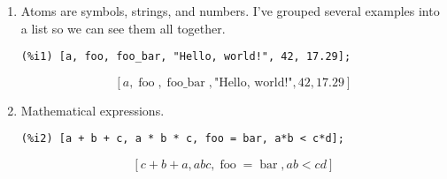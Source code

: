 \documentclass[12pt,leqno]{article}
\begin{document}
\begin{enumerate}

\item Atoms are symbols, strings, and numbers.
I've grouped several examples into a list so we can see them all together.
\begin{verbatim}
(%i1) [a, foo, foo_bar, "Hello, world!", 42, 17.29];
\end{verbatim}
\begin{dmath}[number={\(\mathop{\mathrm{\%o}_{1}}\)}]
\left[a, \mathop{\mathrm{foo}}, \mathop{\mathrm{foo\_bar}}, \text{"Hello, world!"}, 42, 17.29\right]
\end{dmath}

\item Mathematical expressions.
\begin{verbatim}
(%i2) [a + b + c, a * b * c, foo = bar, a*b < c*d];
\end{verbatim}
\begin{dmath}[number={\(\mathop{\mathrm{\%o}_{2}}\)}]
\left[c+b+a, a b c, \mathop{\mathrm{foo}} = \mathop{\mathrm{bar}}, a b < c d\right]
\end{dmath}



\end{enumerate}
\end{document}
